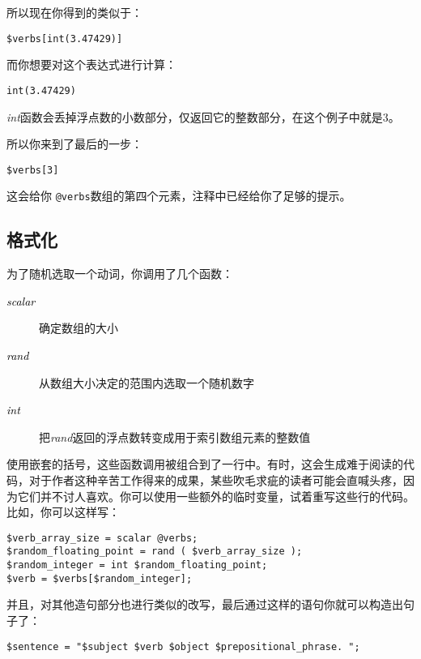 所以现在你得到的类似于：

\begin{lstlisting}
$verbs[int(3.47429)] 
\end{lstlisting}

而你想要对这个表达式进行计算：

\begin{lstlisting}
int(3.47429) 
\end{lstlisting}

\textit{int}函数会丢掉浮点数的小数部分，仅返回它的整数部分，在这个例子中就是3。

所以你来到了最后的一步：

\begin{lstlisting}
$verbs[3]
\end{lstlisting}

这会给你 \verb|@verbs|数组的第四个元素，注释中已经给你了足够的提示。

\subsection{格式化}
为了随机选取一个动词，你调用了几个函数：

\begin{description}
  \item[\textcolor{black}{\textit{scalar}}] 确定数组的大小
  \item[\textcolor{black}{\textit{rand}}] 从数组大小决定的范围内选取一个随机数字
  \item[\textcolor{black}{\textit{int}}] 把\textit{rand}返回的浮点数转变成用于索引数组元素的整数值
\end{description}

使用嵌套的括号，这些函数调用被组合到了一行中。有时，这会生成难于阅读的代码，对于作者这种辛苦工作得来的成果，某些吹毛求疵的读者可能会直喊头疼，因为它们并不讨人喜欢。你可以使用一些额外的临时变量，试着重写这些行的代码。比如，你可以这样写：

\begin{lstlisting}
$verb_array_size = scalar @verbs;
$random_floating_point = rand ( $verb_array_size );
$random_integer = int $random_floating_point;
$verb = $verbs[$random_integer];
\end{lstlisting}

并且，对其他造句部分也进行类似的改写，最后通过这样的语句你就可以构造出句子了：

\begin{lstlisting}
$sentence = "$subject $verb $object $prepositional_phrase. ";
\end{lstlisting}

